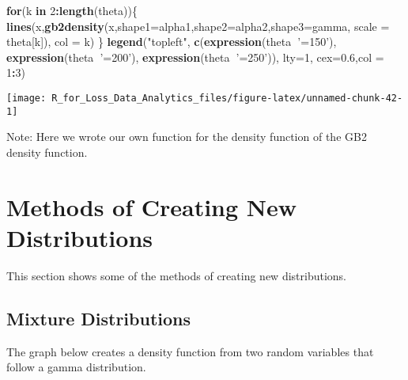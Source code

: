 \documentclass[]{book}
\newenvironment{Shaded}{\begin{snugshade}}{\end{snugshade}}
\newcommand{\KeywordTok}[1]{\textcolor[rgb]{0.13,0.29,0.53}{\textbf{#1}}}
\newcommand{\DataTypeTok}[1]{\textcolor[rgb]{0.13,0.29,0.53}{#1}}
\newcommand{\DecValTok}[1]{\textcolor[rgb]{0.00,0.00,0.81}{#1}}
\newcommand{\FloatTok}[1]{\textcolor[rgb]{0.00,0.00,0.81}{#1}}
\newcommand{\StringTok}[1]{\textcolor[rgb]{0.31,0.60,0.02}{#1}}
\newcommand{\ControlFlowTok}[1]{\textcolor[rgb]{0.13,0.29,0.53}{\textbf{#1}}}
\newcommand{\OperatorTok}[1]{\textcolor[rgb]{0.81,0.36,0.00}{\textbf{#1}}}
\newcommand{\NormalTok}[1]{#1}
\theoremstyle{definition}
\theoremstyle{definition}
\theoremstyle{definition}
\theoremstyle{remark}
\begin{document}
\begin{Shaded}
\begin{Highlighting}[]
\ControlFlowTok{for}\NormalTok{(k }\ControlFlowTok{in} \DecValTok{2}\OperatorTok{:}\KeywordTok{length}\NormalTok{(theta))\{}
  \KeywordTok{lines}\NormalTok{(x,}\KeywordTok{gb2density}\NormalTok{(x,}\DataTypeTok{shape1=}\NormalTok{alpha1,}\DataTypeTok{shape2=}\NormalTok{alpha2,}\DataTypeTok{shape3=}\NormalTok{gamma, }\DataTypeTok{scale =}\NormalTok{ theta[k]), }\DataTypeTok{col =}\NormalTok{ k)}
\NormalTok{\}}
\KeywordTok{legend}\NormalTok{(}\StringTok{"topleft"}\NormalTok{, }\KeywordTok{c}\NormalTok{(}\KeywordTok{expression}\NormalTok{(theta}\OperatorTok{~}\StringTok{'=150'}\NormalTok{), }\KeywordTok{expression}\NormalTok{(theta}\OperatorTok{~}\StringTok{'=200'}\NormalTok{), }\KeywordTok{expression}\NormalTok{(theta}\OperatorTok{~}\StringTok{'=250'}\NormalTok{)), }\DataTypeTok{lty=}\DecValTok{1}\NormalTok{, }\DataTypeTok{cex=}\FloatTok{0.6}\NormalTok{,}\DataTypeTok{col =} \DecValTok{1}\OperatorTok{:}\DecValTok{3}\NormalTok{)}
\end{Highlighting}
\end{Shaded}

\begin{center}\texttt{[image: R\_for\_Loss\_Data\_Analytics\_files/figure-latex/unnamed-chunk-42-1]} \end{center}

Note: Here we wrote our own function for the density function of the GB2
density function.

\section{Methods of Creating New
Distributions}\label{methods-of-creating-new-distributions}

This section shows some of the methods of creating new distributions.

\subsection{Mixture Distributions}\label{mixture-distributions}

The graph below creates a density function from two random variables
that follow a gamma distribution.
\end{document}
